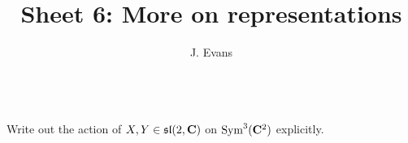 \documentclass[12pt]{article}
\title{Sheet 6: More on representations}
\author{J. Evans}
\date{}
\begin{document}
\maketitle

\begin{question}\ \\
Write out the action of $X,Y\in\mathfrak{sl}(2,\mathbf{C})$ on $\operatorname{Sym}^3(\mathbf{C}^2)$ explicitly.
\end{question}

\iffalse
\begin{answer}
The $\OP{Sym}^3\CC^2$ action of $X$ with respect to the basis
\[e_1^{\otimes 3},\ e_1^2e_2=\frac{1}{3}(e_1\otimes e_1\otimes e_2+\mbox{cyclic permutations}),\ e_1e_2^2=\frac{1}{3}(e_1\otimes e_2\otimes e_2+\mbox{cyclic permutations}),\ e_2^3\]
sends
\begin{align*}
e_1^{\otimes 3}&\mapsto 0\\
e_1^2e_2&\mapsto e_1^{\otimes 3}\\
e_1e_2^2&\mapsto 2e_1^2e_2\\
e_2^{\otimes 3}&\mapsto 3e_1e_2^2
\end{align*}
and for $Y$ we get
\begin{align*}
e_1^{\otimes 3}&\mapsto 3e_1^2e_2\\
e_1^2e_2&\mapsto 2e_1e_2^2\\
e_1e_2^2&\mapsto e_2^{\otimes 3}\\
e_2^{\otimes 3}&\mapsto 0.
\end{align*}
As matrices with respect to this polynomial basis, we have
\[\OP{Sym}^3(X)=\left(\begin{array}{cccc}0&1&0&0\\ 0&0&2&0\\ 0&0&0&3\\ 0&0&0&0\end{array}\right)\]
and
\[\OP{Sym}^3(Y)=\left(\begin{array}{cccc}0&0&0&0\\ 3&0&0&0\\ 0&2&0&0\\ 0&0&1&0\end{array}\right)\]
\end{answer}
\newpage
\fi

\bigskip
\end{document}
